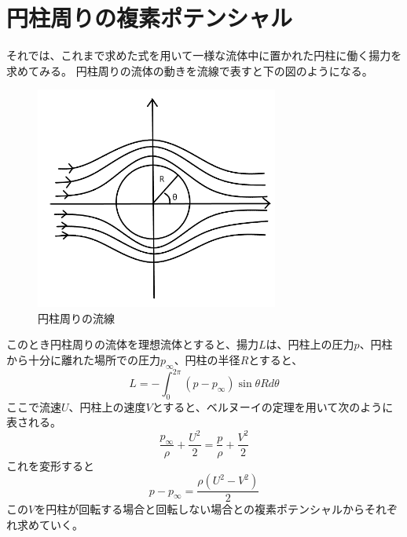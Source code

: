 \documentclass[10pt,b5paper,papersize,dvipdfmx]{jsbook}
\begin{document}
\section{円柱周りの複素ポテンシャル}
それでは、これまで求めた式を用いて一様な流体中に置かれた円柱に働く揚力を求めてみる。  円柱周りの流体の動きを流線で表すと下の図のようになる。
\begin{figure}[ht]
  \centering
\includegraphics[width=80mm]{img/ryuutai1.png}
\caption{円柱周りの流線}
\end{figure}
\par
このとき円柱周りの流体を理想流体とすると、揚力$L$は、円柱上の圧力$p$、円柱から十分に離れた場所での圧力$p_\infty$、円柱の半径$R$とすると、
\begin{equation}
L=-\int_0^{2\pi}(p-p_\infty)\sin\theta Rd\theta
\end{equation}
ここで流速$U$、円柱上の速度$V$とすると、ベルヌーイの定理を用いて次のように表される。
\begin{equation}
\frac{p_\infty}{\rho}+\frac{U^2}{2}=\frac{p}{\rho}+\frac{V^2}{2}
\end{equation}
これを変形すると
\begin{equation}
p-p_\infty=\frac{\rho(U^2-V^2)}{2}
\end{equation}
この$V$を円柱が回転する場合と回転しない場合との複素ポテンシャルからそれぞれ求めていく。
\end{document}
